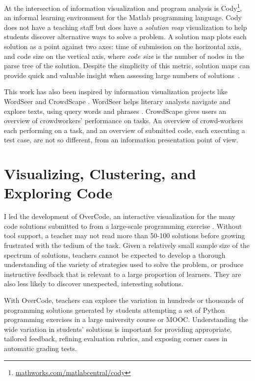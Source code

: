 \documentclass{sigchi}
\begin{document}
At the intersection of information visualization and program analysis is Cody\footnote{\url{mathworks.com/matlabcentral/cody}}, an informal learning environment for the Matlab programming language. Cody does not have a teaching staff but does have a {\em solution map} visualization to help students discover alternative ways to solve a problem. A solution map plots each solution as a point against two axes: time of submission on the horizontal axis, and code size on the vertical axis, where \textit{code size} is the number of nodes in the parse tree of the solution. Despite the simplicity of this metric, solution maps can provide quick and valuable insight when assessing large numbers of solutions~\cite{ICERGlassman}.

This work has also been inspired by information visualization projects like WordSeer \cite{wordseerlitcomp13,wordseercikm13} and CrowdScape \cite{crowdscape}. WordSeer helps literary analysts navigate and explore texts, using query words and phrases \cite{wordseerhcir11}. CrowdScape gives users an overview of crowdworkers' performance on tasks. An overview of crowd-workers each performing on a task, and an overview of submitted code, each executing a test case, are not so different, from an information presentation point of view.

\section{Visualizing, Clustering, and Exploring Code}
I led the development of OverCode, an interactive visualization for the many code solutions submitted to from a large-scale programming exercise \cite{OverCode}. Without tool support, a teacher may not read more than 50-100 solutions before growing frustrated with the tedium of the task. Given a relatively small sample size of the spectrum of solutions, teachers cannot be expected to develop a thorough understanding of the variety of strategies used to solve the problem, or produce instructive feedback that is relevant to a large proportion of learners. They are also less likely to discover unexpected, interesting solutions.

With OverCode, teachers can explore the variation in hundreds or thousands of programming solutions generated by students attempting a set of Python programming exercises in a large university course or MOOC. Understanding the wide variation in students' solutions is important for providing appropriate, tailored feedback, refining evaluation rubrics, and exposing corner cases in automatic grading tests.
\end{document}

